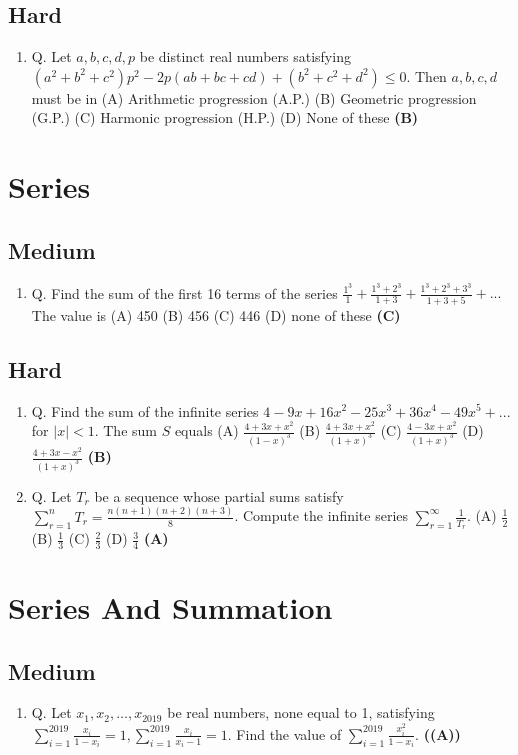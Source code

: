 \documentclass{article}
\begin{document}
\subsection{Hard}
\begin{enumerate}
\item Q. Let $a, b, c, d, p$ be distinct real numbers satisfying
$(a^2 + b^2 + c^2)p^2 - 2p (ab+bc+cd) + (b^2+c^2 + d^2) \leq 0$.
Then $a, b, c, d$ must be in
(A) Arithmetic progression (A.P.)
(B) Geometric progression (G.P.)
(C) Harmonic progression (H.P.)
(D) None of these \hfill \textbf{(B)}
\end{enumerate}
\section{Series}
\subsection{Medium}
\begin{enumerate}
\item Q. Find the sum of the first 16 terms of the series
$\frac{1^3}{1} + \frac{1^3 + 2^3}{1+3} + \frac{1^3 + 2^3 + 3^3}{1+3+5} + ...$
The value is
(A) 450
(B) 456
(C) 446
(D) none of these \hfill \textbf{(C)}
\end{enumerate}
\subsection{Hard}
\begin{enumerate}
\item Q. Find the sum of the infinite series
$4 - 9x + 16x^2 - 25x^3 + 36x^4 - 49x^5 + ...$
for $|x| < 1$. The sum $S$ equals
(A) $\frac{4 + 3x + x^2}{(1-x)^3}$
(B) $\frac{4 + 3x + x^2}{(1+x)^3}$
(C) $\frac{4- 3x + x^2}{(1+x)^3}$
(D) $\frac{4+ 3x - x^2}{(1+x)^3}$ \hfill \textbf{(B)}
\item Q. Let $T_r$ be a sequence whose partial sums satisfy
$\sum_{r=1}^{n} T_r = \frac{n(n + 1)(n+2)(n + 3)}{8}$.
Compute the infinite series $\sum_{r=1}^{\infty} \frac{1}{T_r}$.
(A) $\frac{1}{2}$
(B) $\frac{1}{3}$
(C) $\frac{2}{3}$
(D) $\frac{3}{4}$ \hfill \textbf{(A)}
\end{enumerate}
\section{Series And Summation}
\subsection{Medium}
\begin{enumerate}
\item Q. Let $x_1, x_2, \dots, x_{2019}$ be real numbers, none equal to 1, satisfying $\sum_{i=1}^{2019} \frac{x_i}{1 - x_i} = 1, \sum_{i=1}^{2019} \frac{x_i}{x_i - 1} = 1$. Find the value of $\sum_{i=1}^{2019} \frac{x_i^2}{1 - x_i}$. \hfill \textbf{((A))}
\end{enumerate}
\end{document}
